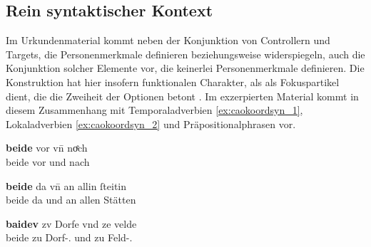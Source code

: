 
\subsection{Rein syntaktischer Kontext}
\label{subsec:caobeidquantsyncont}

Im Urkundenmaterial kommt neben der Konjunktion von Controllern und Targets,
die Personenmerkmale definieren beziehungsweise widerspiegeln, auch die
Konjunktion solcher Elemente vor, die keinerlei Personenmerkmale definieren.
Die Konstruktion   hat
hier insofern funktionalen Charakter, als  als Fokuspartikel dient,
die die Zweiheit der Optionen betont \autocites(siehe auch
\cref{sec:ovwbeideconj})[425--428]{johannessen2005}.
% 
% 
% 
Im exzerpierten Material kommt  in diesem Zusammenhang mit
Temporaladverbien \cref{ex:caokoordsyn_1}, Lokaladverbien
\cref{ex:caokoordsyn_2} und Präpositionalphrasen
 vor.

\begin{exe}
\ex \label{ex:caokoordsyn}
	\begin{xlist}
	\ex \label{ex:caokoordsyn_1}
		\gll \textbf{beide} vor vn̄ noͤch \\
			beide vor und nach \\
		\begin{taggedline}{\parencites(Straßburg, 1295)[\pno~N~689, 499.25]{cao5}}
		\trans {}
		\end{taggedline}

	\ex \label{ex:caokoordsyn_2}
		\gll \textbf{beide} da vn̄ an allin ſteitin \\
			beide da und an allen Stätten \\
		\begin{taggedline}{\parencites(Rosheim, Dépt.~Bas-Rhin, 1286)[\pno~N~321, 245.24]{cao5}}
		\trans {}
		\end{taggedline}

	\ex \label{ex:caokoordsyn_3}
		\gll \textbf{baidev} zv Dorfe vnd ze velde \\
			beide zu Dorf-\Dat.\Sg{} und zu Feld-\Dat.\Sg{} \\
		\begin{taggedline}{\parencites(Michelstetten, Bz.~Mistelbach, 1299)[\pno~3319, 461.28]{cao4}}
		\trans {}
		\end{taggedline}
	\end{xlist}
\end{exe}

